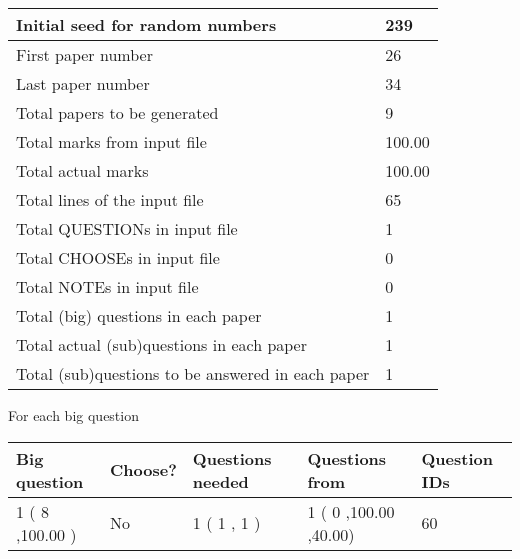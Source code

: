 \documentclass[12pt]{article}
\begin{document}
 \begin{tabular}{|l|l|}
 \hline
 Initial seed for random numbers & 239  \\
\hline
 First paper number & 26  \\
\hline
 Last  paper number & 34  \\
\hline
 Total papers to be generated & 9  \\
\hline
Total marks from input file & 100.00 \\
\hline
Total actual marks & 100.00 \\
\hline
 Total lines of the input file & 65  \\
 \hline
 Total QUESTIONs in input file & 1  \\
\hline
 Total CHOOSEs in input file & 0  \\
\hline
 Total NOTEs in input file & 0  \\
\hline
 Total (big) questions in each paper & 1  \\
\hline
 Total actual (sub)questions in each paper & 1  \\
\hline
 Total (sub)questions to be answered in each paper & 1  \\
\hline
 \end{tabular}
   
   
 \newpage
   
{\LARGE{For each big question}}
   
   
\vspace{0.2in}
   
   
\noindent\hspace{-0.4in}\begin{tabular}{|l|l|l|l|l|}
\hline
 Big question & Choose? & Questions needed & Questions from & Question IDs \\ 
\hline
 1 ( 8 ,100.00
 ) &  No   & 
 1 ( 1 ,  1 ) &  1 ( 0
,100.00
 ,40.00) &  60  \\
 \hline
 \end{tabular}
 
 
\end{document}
